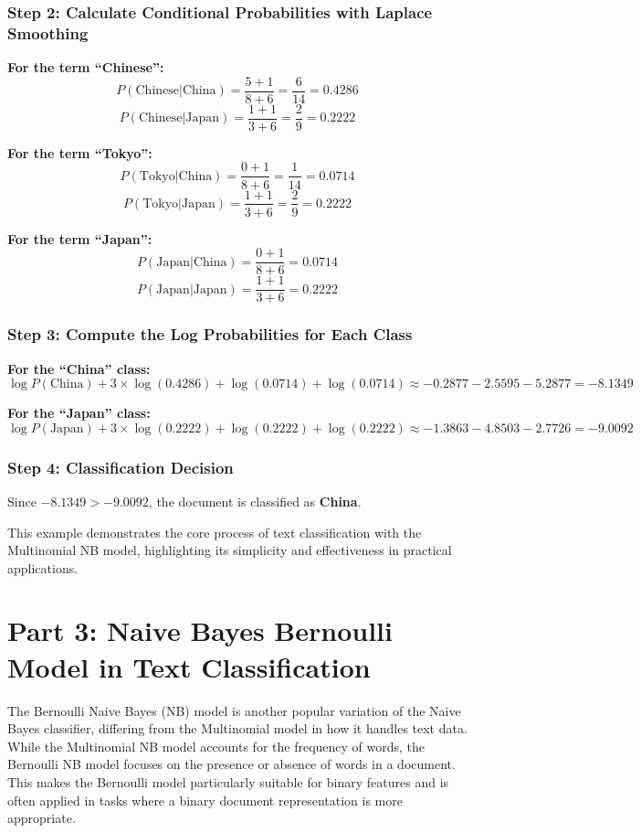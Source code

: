 \documentclass{article}
\begin{document}
\subsubsection*{Step 2: Calculate Conditional Probabilities with Laplace Smoothing}

\textbf{For the term ``Chinese'':}
\[
P(\text{Chinese} | \text{China}) = \frac{5 + 1}{8 + 6} = \frac{6}{14} = 0.4286
\]
\[
P(\text{Chinese} | \text{Japan}) = \frac{1 + 1}{3 + 6} = \frac{2}{9} = 0.2222
\]

\textbf{For the term ``Tokyo'':}
\[
P(\text{Tokyo} | \text{China}) = \frac{0 + 1}{8 + 6} = \frac{1}{14} = 0.0714
\]
\[
P(\text{Tokyo} | \text{Japan}) = \frac{1 + 1}{3 + 6} = \frac{2}{9} = 0.2222
\]

\textbf{For the term ``Japan'':}
\[
P(\text{Japan} | \text{China}) = \frac{0 + 1}{8 + 6} = 0.0714
\]
\[
P(\text{Japan} | \text{Japan}) = \frac{1 + 1}{3 + 6} = 0.2222
\]

\subsubsection*{Step 3: Compute the Log Probabilities for Each Class}

\textbf{For the ``China'' class:}
\[
\log P(\text{China}) + 3 \times \log(0.4286) + \log(0.0714) + \log(0.0714)
\approx -0.2877 - 2.5595 - 5.2877 = -8.1349
\]

\textbf{For the ``Japan'' class:}
\[
\log P(\text{Japan}) + 3 \times \log(0.2222) + \log(0.2222) + \log(0.2222)
\approx -1.3863 - 4.8503 - 2.7726 = -9.0092
\]

\subsubsection*{Step 4: Classification Decision}
Since \( -8.1349 > -9.0092 \), the document is classified as \textbf{China}.

This example demonstrates the core process of text classification with the Multinomial NB model, highlighting its simplicity and effectiveness in practical applications.

\section*{Part 3: Naive Bayes Bernoulli Model in Text Classification}

The Bernoulli Naive Bayes (NB) model is another popular variation of the Naive Bayes classifier, differing from the Multinomial model in how it handles text data. While the Multinomial NB model accounts for the frequency of words, the Bernoulli NB model focuses on the presence or absence of words in a document. This makes the Bernoulli model particularly suitable for binary features and is often applied in tasks where a binary document representation is more appropriate.
\end{document}
